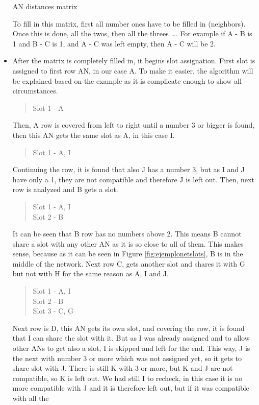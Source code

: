 \begin{itemize}
\begin{table}
\begin{center}
  \caption{\ac{AN} distances matrix}
  \label{tab:neighborsmatrix}
 \end{center}
\end{table}
To fill in this matrix, first all number ones have to be filled in (neighbors). Once this is done, all the twos, then all the threes \ldots. For 
example if A - B is 1 and B - C is 1, and A - C was left empty, then A - C will be 2.
 \item After the matrix is completely filled in, it begins slot assignation. First slot is assigned to first row \ac{AN}, in our case A. To 
make it easier, the algorithm will be explained based on the example as it is complicate enough to show all circumstances.
\begin{quote}
 Slot 1 - A
\end{quote}
Then, A row is covered from left to right until a number 3 or bigger is found, then this \ac{AN} gets the same slot as A, in this case I.
\begin{quote}
 Slot 1 - A, I
\end{quote}
Continuing the row, it is found that also J has a number 3, but as I and J have only a 1, they are not compatible and therefore J is left out. 
Then, next row is analyzed and B gets a slot.
\begin{quote}
 Slot 1 - A, I \\ Slot 2 - B
\end{quote}
It can be seen that B row has no numbers above 2. This means B cannot share a slot with any other \ac{AN} as it is so close to all of them. 
This makes sense, because as it can be seen in Figure \ref{fig:ejemplonetslots}, B is in the middle of the network. Next row C, gets another
slot and shares it with G but not with H for the same reason as A, I and J.
\begin{quote}
 Slot 1 - A, I \\ Slot 2 - B \\ Slot 3 - C, G
\end{quote}
Next row is D, this \ac{AN} gets its own slot, and covering the row, it is found that I can share the slot with it. But as I was already 
assigned and to allow other \acp{AN} to get also a slot, I is skipped and left for the end. This way, J is the next with number 3 or more 
which was not assigned yet, so it gets to share slot with J. There is still K with 3 or more, but K and J are not compatible, so K is left out.
We had still I to recheck, in this case it is no more compatible with J and it is therefore left out, but if it was compatible with all the 

\end{itemize}
